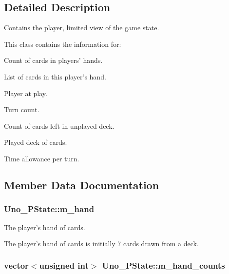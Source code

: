 \subsection{\-Detailed \-Description}
\-Contains the player, limited view of the game state. 

\-This class contains the information for\-: \begin{DoxyItemize}
\item \-Count of cards in players' hands. \item \-List of cards in this player's hand. \item \-Player at play. \item \-Turn count. \item \-Count of cards left in unplayed deck. \item \-Played deck of cards. \item \-Time allowance per turn. \end{DoxyItemize}


\subsection{\-Member \-Data \-Documentation}
\hypertarget{class_uno___p_state_ae83f531e09b87d69dccb49bf44af4e0a}{
\subsubsection[{m\-\_\-hand}]{ {\bf \-Uno\-\_\-\-P\-State\-::m\-\_\-hand}}}
\label{class_uno___p_state_ae83f531e09b87d69dccb49bf44af4e0a}


\-The player's hand of cards. 

\-The player's hand of cards is initially 7 cards drawn from a deck. \hypertarget{class_uno___p_state_a8e4b3ec3783d8ed58bd761ac6c7be3b6}{
\subsubsection[{m\-\_\-hand\-\_\-counts}]{\setlength{\rightskip}{0pt plus 5cm}vector$<$unsigned int$>$ {\bf \-Uno\-\_\-\-P\-State\-::m\-\_\-hand\-\_\-counts}}}
\label{class_uno___p_state_a8e4b3ec3783d8ed58bd761ac6c7be3b6}


